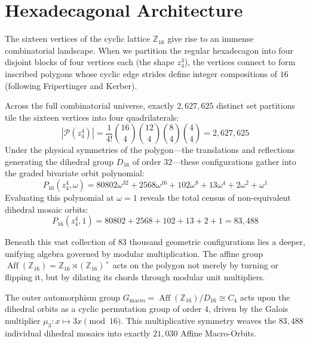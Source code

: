 \section{Hexadecagonal Architecture}
\label{sec:introduction}

The sixteen vertices of the cyclic lattice $\mathbb{Z}_{16}$ give rise to an immense combinatorial landscape. When we partition the regular hexadecagon into four disjoint blocks of four vertices each (the shape $z_4^4$), the vertices connect to form inscribed polygons whose cyclic edge strides define integer compositions of $16$ (following Fripertinger and Kerber). 

Across the full combinatorial universe, exactly $2{,}627{,}625$ distinct set partitions tile the sixteen vertices into four quadrilaterals:
\begin{equation}
\label{eqn:raw-universe-z44}
|\mathcal{P}(z_4^4)| = \frac{1}{4!} \binom{16}{4} \binom{12}{4} \binom{8}{4} \binom{4}{4} = 2{,}627{,}625
\end{equation}
Under the physical symmetries of the polygon—the translations and reflections generating the dihedral group $D_{16}$ of order $32$—these configurations gather into the graded bivariate orbit polynomial:
\begin{equation}
\label{eqn:orbit-poly-d16}
P_{16}(z_4^4, \omega) = 80802\omega^{32} + 2568\omega^{16} + 102\omega^{8} + 13\omega^{4} + 2\omega^{2} + \omega^{1}
\end{equation}
Evaluating this polynomial at $\omega = 1$ reveals the total census of non-equivalent dihedral mosaic orbits:
\begin{equation}
\label{eqn:total-d16-orbits}
P_{16}(z_4^4, 1) = 80802 + 2568 + 102 + 13 + 2 + 1 = 83{,}488
\end{equation}

Beneath this vast collection of 83 thousand geometric configurations lies a deeper, unifying algebra governed by modular multiplication. The affine group $\operatorname{Aff}(\mathbb{Z}_{16}) = \mathbb{Z}_{16} \rtimes (\mathbb{Z}_{16})^\times$ acts on the polygon not merely by turning or flipping it, but by dilating its chords through modular unit multipliers.

The outer automorphism group $G_{\text{macro}} = \operatorname{Aff}(\mathbb{Z}_{16}) / D_{16} \cong C_4$ acts upon the dihedral orbits as a cyclic permutation group of order $4$, driven by the Galois multiplier $\mu_3 \colon x \mapsto 3x \pmod{16}$. This multiplicative symmetry weaves the $83{,}488$ individual dihedral mosaics into exactly $21{,}030$ Affine Macro-Orbits.

